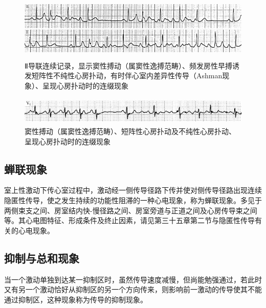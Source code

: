\begin{figure}[!htbp]
 \centering
 \includegraphics[width=5.58333in,height=1.22917in]{./images/Image00669.jpg}
 \captionsetup{justification=centering}
 \caption{Ⅱ导联连续记录，显示窦性搏动（属窦性逸搏范畴）、频发房性早搏诱发短阵性不纯性心房扑动，有时伴心室内差异性传导（Ashman现象）、呈现心房扑动时的连缀现象}
 \label{fig40-8}
  \end{figure} 

\begin{figure}[!htbp]
 \centering
 \includegraphics[width=5.58333in,height=0.53125in]{./images/Image00670.jpg}
 \captionsetup{justification=centering}
 \caption{窦性搏动（属窦性逸搏范畴）、短阵性心房扑动及不纯性心房扑动、呈现心房扑动时的连缀现象}
 \label{fig40-9}
  \end{figure} 

\protect\hypertarget{text00047.htmlux5cux23subid542}{}{}

\subsection{蝉联现象}

室上性激动下传心室过程中，激动经一侧传导径路下传并使对侧传导径路出现连续隐匿性传导，使之发生持续的功能性阻滞的一种心电现象，称为蝉联现象。多见于两侧束支之间、房室结内快-慢径路之间、房室旁道与正道之间及心房传导束之间等。其心电图特征、形成条件及终止因素，请见第三十五章第二节与隐匿性传导有关的心电现象。

\protect\hypertarget{text00047.htmlux5cux23subid543}{}{}

\subsection{抑制与总和现象}

当一个激动单独到达某一抑制区时，虽然传导速度减慢，但尚能勉强通过，若此时又有另一个激动恰好从抑制区的另一个方向传来，则影响前一激动的传导使其不能通过抑制区，这种现象称为传导的抑制现象。

